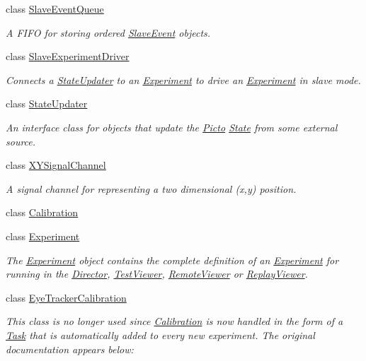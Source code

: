 \begin{DoxyCompactItemize}
class \hyperlink{class_picto_1_1_slave_event_queue}{Slave\-Event\-Queue}
\begin{DoxyCompactList}\small\item\em A F\-I\-F\-O for storing ordered \hyperlink{class_picto_1_1_slave_event}{Slave\-Event} objects. \end{DoxyCompactList}\item 
class \hyperlink{class_picto_1_1_slave_experiment_driver}{Slave\-Experiment\-Driver}
\begin{DoxyCompactList}\small\item\em Connects a \hyperlink{class_picto_1_1_state_updater}{State\-Updater} to an \hyperlink{class_picto_1_1_experiment}{Experiment} to drive an \hyperlink{class_picto_1_1_experiment}{Experiment} in slave mode. \end{DoxyCompactList}\item 
class \hyperlink{class_picto_1_1_state_updater}{State\-Updater}
\begin{DoxyCompactList}\small\item\em An interface class for objects that update the \hyperlink{namespace_picto}{Picto} \hyperlink{class_picto_1_1_state}{State} from some external source. \end{DoxyCompactList}\item 
class \hyperlink{class_picto_1_1_x_y_signal_channel}{X\-Y\-Signal\-Channel}
\begin{DoxyCompactList}\small\item\em A signal channel for representing a two dimensional (x,y) position. \end{DoxyCompactList}\item 
class \hyperlink{class_picto_1_1_calibration}{Calibration}
\item 
class \hyperlink{class_picto_1_1_experiment}{Experiment}
\begin{DoxyCompactList}\small\item\em The \hyperlink{class_picto_1_1_experiment}{Experiment} object contains the complete definition of an \hyperlink{class_picto_1_1_experiment}{Experiment} for running in the \hyperlink{class_director}{Director}, \hyperlink{class_test_viewer}{Test\-Viewer}, \hyperlink{class_remote_viewer}{Remote\-Viewer} or \hyperlink{class_replay_viewer}{Replay\-Viewer}. \end{DoxyCompactList}\item 
class \hyperlink{class_picto_1_1_eye_tracker_calibration}{Eye\-Tracker\-Calibration}
\begin{DoxyCompactList}\small\item\em This class is no longer used since \hyperlink{class_picto_1_1_calibration}{Calibration} is now handled in the form of a \hyperlink{class_picto_1_1_task}{Task} that is automatically added to every new experiment. The original documentation appears below\-: \end{DoxyCompactList}\item 

\end{DoxyCompactItemize}
